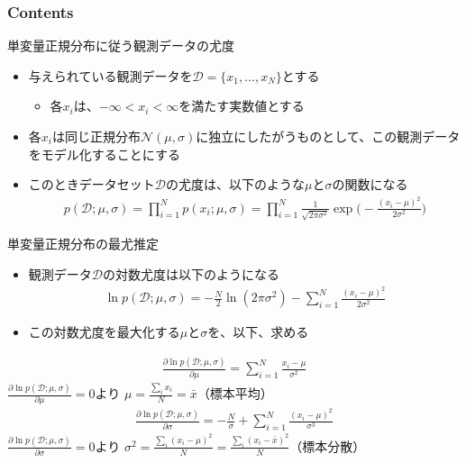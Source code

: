 \documentclass[aspectratio=169,unicode,dvipdfmx,14pt]{beamer}
\begin{document}
\begin{frame}\frametitle{Contents}
\Large \tableofcontents[currentsection]
\end{frame}

\begin{frame}{単変量正規分布に従う観測データの尤度}
\begin{itemize}
\item 与えられている観測データを$\mathcal{D}=\{x_1,\ldots,x_N\}$とする
\begin{itemize}
\item 各$x_i$は、$-\infty < x_i < \infty$を満たす実数値とする
\end{itemize}
\item 各$x_i$は同じ正規分布$\mathcal{N}(\mu,\sigma)$に独立にしたがうものとして、この観測データをモデル化することにする
\item このときデータセット$\mathcal{D}$の尤度は、以下のような$\mu$と$\sigma$の関数になる
\begin{align}
p(\mathcal{D};\mu,\sigma)=\prod_{i=1}^N p(x_i;\mu,\sigma)
=\prod_{i=1}^N \frac{1}{\sqrt{2\pi\sigma^2}}\exp\bigg( - \frac{(x_i - \mu)^2}{2\sigma^2}\bigg)
\end{align}
\end{itemize}
\end{frame}


\begin{frame}{単変量正規分布の最尤推定}
\begin{itemize}
\item 観測データ$\mathcal{D}$の対数尤度は以下のようになる
\begin{align}
\ln p(\mathcal{D};\mu,\sigma)
= -\frac{N}{2}\ln(2\pi\sigma^2) - \sum_{i=1}^N \frac{(x_i - \mu)^2}{2\sigma^2}
\end{align}
\item この対数尤度を最大化する$\mu$と$\sigma$を、以下、求める
\end{itemize}
\end{frame}


\begin{frame}
\begin{align}
\frac{\partial \ln p(\mathcal{D};\mu,\sigma)}{\partial \mu}
= \sum_{i=1}^N \frac{x_i - \mu}{\sigma^2}
\end{align}
$\frac{\partial \ln p(\mathcal{D};\mu,\sigma)}{\partial \mu}=0$より
$\mu = \frac{\sum_i x_i}{N} = \bar{x}$（標本平均）
\begin{align}
\frac{\partial \ln p(\mathcal{D};\mu,\sigma)}{\partial \sigma}
= - \frac{N}{\sigma} + \sum_{i=1}^N \frac{(x_i - \mu)^2}{\sigma^3}
\end{align}
$\frac{\partial \ln p(\mathcal{D};\mu,\sigma)}{\partial \sigma} = 0$より
$\sigma^2 = \frac{\sum_i (x_i - \mu)^2}{N} = \frac{\sum_i (x_i - \bar{x})^2}{N}$（標本分散）
\end{frame}
\end{document}
